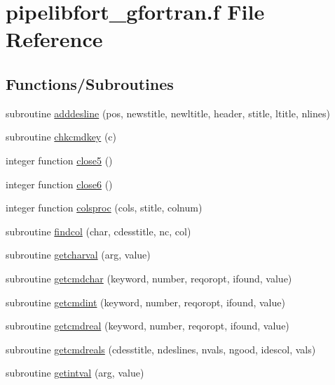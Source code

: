 \hypertarget{pipelibfort__gfortran_8f}{\section{pipelibfort\-\_\-gfortran.\-f File Reference}
\label{pipelibfort__gfortran_8f}
}
\subsection*{Functions/\-Subroutines}
\begin{DoxyCompactItemize}
\item 
subroutine \hyperlink{pipelibfort__gfortran_8f_aeaae93b6dc684342c79487a745a99a51}{adddesline} (pos, newstitle, newltitle, header, stitle, ltitle, nlines)
\item 
subroutine \hyperlink{pipelibfort__gfortran_8f_a8a8336a9de43f7daefefb8ac9ba79fac}{chkcmdkey} (c)
\item 
integer function \hyperlink{pipelibfort__gfortran_8f_ac98fc153e9cc6c46cd09a4bcbae2dae6}{close5} ()
\item 
integer function \hyperlink{pipelibfort__gfortran_8f_a02f39a677a711c769bbd2fe8c22e4f2e}{close6} ()
\item 
integer function \hyperlink{pipelibfort__gfortran_8f_afe940e5adaa17f7cdb0081228000d09a}{colsproc} (cols, stitle, colnum)
\item 
subroutine \hyperlink{pipelibfort__gfortran_8f_a61b134a644292f1f143d10d073d9cb78}{findcol} (char, cdesstitle, nc, col)
\item 
subroutine \hyperlink{pipelibfort__gfortran_8f_acf76d7e0af8a4d1e7a1b8d50d4739390}{getcharval} (arg, value)
\item 
subroutine \hyperlink{pipelibfort__gfortran_8f_ac1c58de61b7ee46ab7166316e1ea8c46}{getcmdchar} (keyword, number, reqoropt, ifound, value)
\item 
subroutine \hyperlink{pipelibfort__gfortran_8f_a567b5ca9b7bd0af6eedf1c988db9e706}{getcmdint} (keyword, number, reqoropt, ifound, value)
\item 
subroutine \hyperlink{pipelibfort__gfortran_8f_aaa68fe2ce6013f2cba27f4cf85dbb29b}{getcmdreal} (keyword, number, reqoropt, ifound, value)
\item 
subroutine \hyperlink{pipelibfort__gfortran_8f_a9129bdbde4a26040a37c118c0b7334b5}{getcmdreals} (cdesstitle, ndeslines, nvals, ngood, idescol, vals)
\item 
subroutine \hyperlink{pipelibfort__gfortran_8f_a2d8503979198b8f2448f729e5683a394}{getintval} (arg, value)

\end{DoxyCompactItemize}
